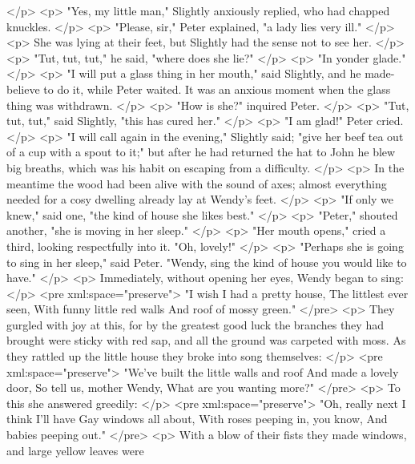     </p>
    <p>
      "Yes, my little man," Slightly anxiously replied, who had chapped
      knuckles.
    </p>
    <p>
      "Please, sir," Peter explained, "a lady lies very ill."
    </p>
    <p>
      She was lying at their feet, but Slightly had the sense not to see her.
    </p>
    <p>
      "Tut, tut, tut," he said, "where does she lie?"
    </p>
    <p>
      "In yonder glade."
    </p>
    <p>
      "I will put a glass thing in her mouth," said Slightly, and he
      made-believe to do it, while Peter waited. It was an anxious moment when
      the glass thing was withdrawn.
    </p>
    <p>
      "How is she?" inquired Peter.
    </p>
    <p>
      "Tut, tut, tut," said Slightly, "this has cured her."
    </p>
    <p>
      "I am glad!" Peter cried.
    </p>
    <p>
      "I will call again in the evening," Slightly said; "give her beef tea out
      of a cup with a spout to it;" but after he had returned the hat to John he
      blew big breaths, which was his habit on escaping from a difficulty.
    </p>
    <p>
      In the meantime the wood had been alive with the sound of axes; almost
      everything needed for a cosy dwelling already lay at Wendy's feet.
    </p>
    <p>
      "If only we knew," said one, "the kind of house she likes best."
    </p>
    <p>
      "Peter," shouted another, "she is moving in her sleep."
    </p>
    <p>
      "Her mouth opens," cried a third, looking respectfully into it. "Oh,
      lovely!"
    </p>
    <p>
      "Perhaps she is going to sing in her sleep," said Peter. "Wendy, sing the
      kind of house you would like to have."
    </p>
    <p>
      Immediately, without opening her eyes, Wendy began to sing:
    </p>
<pre xml:space="preserve">
     "I wish I had a pretty house,
     The littlest ever seen,
     With funny little red walls
     And roof of mossy green."
</pre>
    <p>
      They gurgled with joy at this, for by the greatest good luck the branches
      they had brought were sticky with red sap, and all the ground was carpeted
      with moss. As they rattled up the little house they broke into song
      themselves:
    </p>
<pre xml:space="preserve">
     "We've built the little walls and roof
     And made a lovely door,
     So tell us, mother Wendy,
     What are you wanting more?"
</pre>
    <p>
      To this she answered greedily:
    </p>
<pre xml:space="preserve">
     "Oh, really next I think I'll have
     Gay windows all about,
     With roses peeping in, you know,
     And babies peeping out."
</pre>
    <p>
      With a blow of their fists they made windows, and large yellow leaves were
